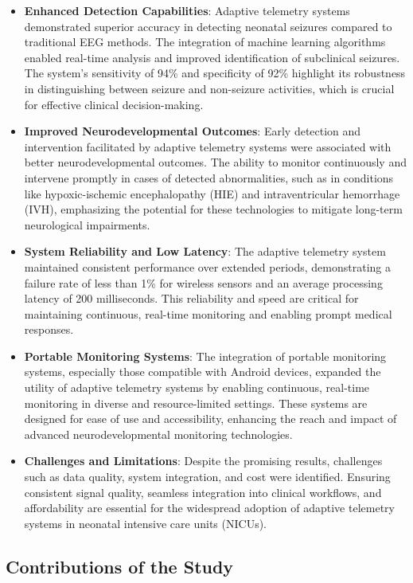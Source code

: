 \documentclass[12pt,journal,compsoc]{IEEEtran}
\begin{document}
\begin{itemize}
    \item \textbf{Enhanced Detection Capabilities}: Adaptive telemetry systems demonstrated superior accuracy in detecting neonatal seizures compared to traditional EEG methods. The integration of machine learning algorithms enabled real-time analysis and improved identification of subclinical seizures. The system's sensitivity of 94\% and specificity of 92\% highlight its robustness in distinguishing between seizure and non-seizure activities, which is crucial for effective clinical decision-making.
    \item \textbf{Improved Neurodevelopmental Outcomes}: Early detection and intervention facilitated by adaptive telemetry systems were associated with better neurodevelopmental outcomes. The ability to monitor continuously and intervene promptly in cases of detected abnormalities, such as in conditions like hypoxic-ischemic encephalopathy (HIE) and intraventricular hemorrhage (IVH), emphasizing the potential for these technologies to mitigate long-term neurological impairments.
    \item \textbf{System Reliability and Low Latency}: The adaptive telemetry system maintained consistent performance over extended periods, demonstrating a failure rate of less than 1\% for wireless sensors and an average processing latency of 200 milliseconds. This reliability and speed are critical for maintaining continuous, real-time monitoring and enabling prompt medical responses.
    \item \textbf{Portable Monitoring Systems}: The integration of portable monitoring systems, especially those compatible with Android devices, expanded the utility of adaptive telemetry systems by enabling continuous, real-time monitoring in diverse and resource-limited settings. These systems are designed for ease of use and accessibility, enhancing the reach and impact of advanced neurodevelopmental monitoring technologies.
    \item \textbf{Challenges and Limitations}: Despite the promising results, challenges such as data quality, system integration, and cost were identified. Ensuring consistent signal quality, seamless integration into clinical workflows, and affordability are essential for the widespread adoption of adaptive telemetry systems in neonatal intensive care units (NICUs).
\end{itemize}

\subsection{Contributions of the Study}
\end{document}
